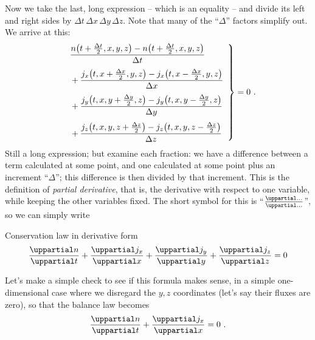 \documentclass[a4paper,12pt,%
onecolumn,oneside,titlepage,%
british%
]{memoir}
\newcommand*{\de}{\uppartial}%
\newcommand*{\incr}{\Delta}%
\renewcommand*{\|}[1][]{\nonscript\:#1\vert\nonscript\:\mathopen{}}
\newcommand*{\Dt}{\incr t}
\newcommand*{\Dx}{\incr x}
\newcommand*{\Dy}{\incr y}
\newcommand*{\Dz}{\incr z}
\newcommand*{\Dth}{\tfrac{\incr t}{2}}
\newcommand*{\Dxh}{\tfrac{\incr x}{2}}
\newcommand*{\Dyh}{\tfrac{\incr y}{2}}
\newcommand*{\Dzh}{\tfrac{\incr z}{2}}
\begin{document}
Now we take the last, long expression -- which is an equality -- and divide its left and right sides by $\Dt\,\Dx\,\Dy\,\Dz$. Note that many of the \enquote{$\incr$} factors simplify out. We arrive at this:
\begin{equation*}
  \label{neq:balance_deriv_incr}
  \left.\begin{aligned}
      &\frac{n\bigl(t+\Dth, x,y,z\bigr)
      -n\bigl(t+\Dth, x,y,z\bigr)}{\Dt}
      \\[\jot]\quad&+\frac{j_{x}\bigl(t, x+\Dxh, y, z\bigr) - j_{x}\bigl(t, x-\Dxh, y, z\bigr)}{\Dx}
      \\[\jot]\quad&+\frac{j_{y}\bigl(t, x, y+\Dyh, z\bigr) - j_{y}\bigl(t, x, y-\Dyh, z\bigr)}{\Dy}
      \\[\jot]\quad&+\frac{j_{z}\bigl(t, x,y,z+\Dzh\bigr) - j_{z}\bigl(t, x,y,z-\Dzh\bigr)}{\Dz}
    \end{aligned}\enspace\right\}=0 \ .
\end{equation*}
Still a long expression; but examine each fraction: we have a difference between a term calculated at some point, and one calculated at some point plus an increment \enquote{${}\incr$}; this difference is then divided by that increment. This is the definition of \emph{partial derivative}, that is, the derivative with respect to one variable, while keeping the other variables fixed. The short symbol for this is \enquote{$\frac{\de\dotso}{\de\dotso}$}, so we can simply write
\begin{definition}{Conservation law in derivative form}
  \begin{equation}
    \label{neq:balance_deriv}
    \frac{\de n}{\de t}%
    +\frac{\de j_{x}}{\de x}%
    +\frac{\de j_{y}}{\de y}%
    +\frac{\de j_{z}}{\de z}%
    = 0
  \end{equation}
\end{definition}
Let's make a simple check to see if this formula makes sense, in a simple one-dimensional case where we disregard the $y,z$ coordinates (let's say their fluxes are zero), so that the balance law becomes
\begin{equation*}
  \frac{\de n}{\de t} + \frac{\de j_{x}}{\de x} = 0 \ .
\end{equation*}
\end{document}
